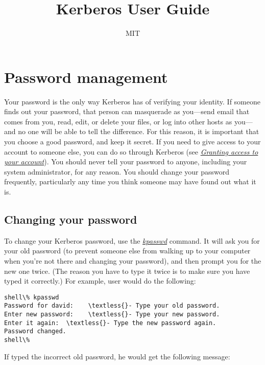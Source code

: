 \documentclass[letterpaper,10pt,english]{sphinxmanual}
\title{Kerberos User Guide}
\date{ }
\author{MIT}
\begin{document}
\maketitle
\tableofcontents
{}\label{user/index::doc}



\chapter{Password management}
\label{user/pwd_mgmt:for-users}\label{user/pwd_mgmt::doc}\label{user/pwd_mgmt:password-management}
Your password is the only way Kerberos has of verifying your identity.
If someone finds out your password, that person can masquerade as
you---send email that comes from you, read, edit, or delete your files,
or log into other hosts as you---and no one will be able to tell the
difference.  For this reason, it is important that you choose a good
password, and keep it secret.  If you need to give access to your
account to someone else, you can do so through Kerberos (see
{\hyperref[user/pwd_mgmt:grant-access]{\emph{Granting access to your account}}}).  You should never tell your password to anyone,
including your system administrator, for any reason.  You should
change your password frequently, particularly any time you think
someone may have found out what it is.


\section{Changing your password}
\label{user/pwd_mgmt:changing-your-password}
To change your Kerberos password, use the {\hyperref[user/user_commands/kpasswd:kpasswd-1]{\emph{kpasswd}}} command.
It will ask you for your old password (to prevent someone else from
walking up to your computer when you're not there and changing your
password), and then prompt you for the new one twice.  (The reason you
have to type it twice is to make sure you have typed it correctly.)
For example, user  would do the following:

\begin{Verbatim}[commandchars=\\\{\}]
shell\% kpasswd
Password for david:    \textless{}- Type your old password.
Enter new password:    \textless{}- Type your new password.
Enter it again:  \textless{}- Type the new password again.
Password changed.
shell\%
\end{Verbatim}

If  typed the incorrect old password, he would get the
following message:
\end{document}
